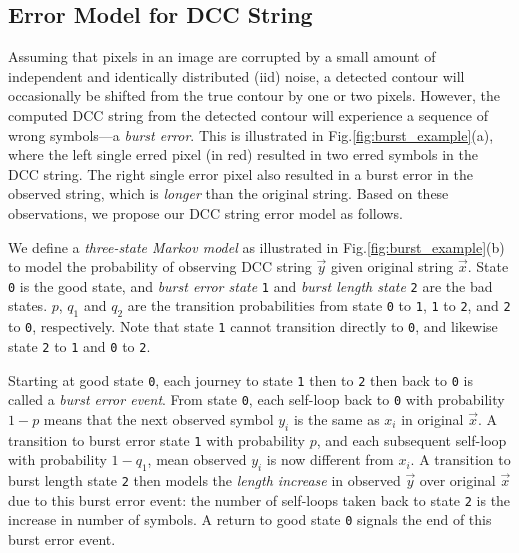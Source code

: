 \subsection{Error Model for DCC String}
\label{subsec:error_model}

Assuming that pixels in an image are corrupted by a small amount of independent and identically distributed (iid) noise, a detected contour will occasionally be shifted from the true contour by one or two pixels. 
However, the computed DCC string from the detected contour will experience a sequence of wrong symbols---a \textit{burst error}. 
This is illustrated in Fig.\;\ref{fig:burst_example}(a), where the left single erred pixel (in red) resulted in two erred symbols in the DCC string. The right single error pixel also resulted in a burst error in the observed string, which is \textit{longer} than the original string. Based on these observations, we propose our DCC string error model as follows.

We define a \textit{three-state Markov model} as illustrated in Fig.\;\ref{fig:burst_example}(b) to model the probability of observing DCC string $\vec{y}$ given original string $\vec{x}$. 
State \texttt{0} is the good state, and \textit{burst error state} \texttt{1} and \textit{burst length state} \texttt{2} are the bad states. 
$p$, $q_1$ and $q_2$ are the transition probabilities from state \texttt{0} to \texttt{1}, \texttt{1} to \texttt{2}, and \texttt{2} to \texttt{0}, respectively.
Note that state \texttt{1} cannot transition directly to \texttt{0}, and likewise state \texttt{2} to \texttt{1} and \texttt{0} to \texttt{2}.

Starting at good state \texttt{0}, each journey to state \texttt{1} then to \texttt{2} then back to \texttt{0} is called a \textit{burst error event}.
From state \texttt{0}, each self-loop back to \texttt{0} with probability $1-p$ means that the next observed symbol $y_i$ is the same as $x_i$ in original $\vec{x}$. 
A transition to burst error state \texttt{1} with probability $p$, and each subsequent self-loop with probability $1-q_1$, mean observed $y_i$ is now different from $x_i$.
A transition to burst length state \texttt{2} then models the \textit{length increase} in observed $\vec{y}$ over original $\vec{x}$ due to this burst error event: the number of self-loops taken back to state \texttt{2} is the increase in number of symbols. 
A return to good state \texttt{0} signals the end of this burst error event. 


